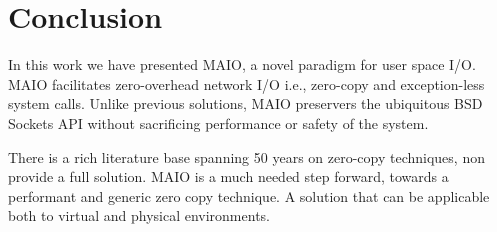 \documentclass[sigconf,9pt]{acmart}
\newcommand{\oursys}{MAIO\xspace}
\newcommand{\sockets}{BSD Sockets\xspace}
\begin{document}
\maketitle
\sloppypar






\section{Conclusion}
In this work we have presented \oursys, a novel paradigm for user space I/O. \oursys facilitates zero-overhead network I/O i.e., zero-copy and exception-less system calls. Unlike previous solutions, \oursys preservers the ubiquitous \sockets API without sacrificing performance or safety of the system.


There is a rich literature base spanning 50 years on zero-copy techniques, non provide a full solution\cite{song2012performance}. \oursys is a much needed step forward, towards a performant and generic zero copy technique. A solution that can be applicable both to virtual and physical environments.



\end{document}
